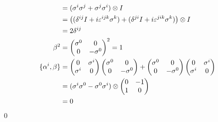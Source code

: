 \documentclass[uplatex,dvipdfmx,a4paper,11pt]{jlreq}
\makeatletter
\theoremstyle{definition}
\renewenvironment{proof}[1][\proofname]{\par
  \normalfont
  \topsep6\p@\@plus6\p@ \trivlist
  \item[\hskip\labelsep{\bfseries #1}\@addpunct{\bfseries}]\ignorespaces\quad\par
}{%
  \qed\endtrivlist\@endpefalse
}
\renewcommand\proofname{証明}
\makeatother
\begin{document}
\begin{proof}
\begin{align}
                                     & = (\sigma^i\sigma^j + \sigma^j\sigma^i)\otimes I                                                           \\
                                     & = \qty((\delta^{ij}I + i\varepsilon^{ijk}\sigma^k) + (\delta^{ji}I + i\varepsilon^{jik}\sigma^k))\otimes I \\
                                     & = 2\delta^{ij}                                                                                             \\
    \beta^2                          & = \begin{pmatrix}
                                           \sigma^0 & 0         \\
                                           0        & -\sigma^0
                                         \end{pmatrix}^2 = 1                                                                                     \\
    \lbrace\alpha^i, \beta\rbrace    & = \begin{pmatrix}
                                           0        & \sigma^i \\
                                           \sigma^i & 0
                                         \end{pmatrix}
    \begin{pmatrix}
      \sigma^0 & 0         \\
      0        & -\sigma^0
    \end{pmatrix} +
    \begin{pmatrix}
      \sigma^0 & 0         \\
      0        & -\sigma^0
    \end{pmatrix}
    \begin{pmatrix}
      0        & \sigma^i \\
      \sigma^i & 0
    \end{pmatrix}                                                                                                                           \\
                                     & = (\sigma^i\sigma^0 - \sigma^0\sigma^i)\otimes\begin{pmatrix}
                                                                                       0 & -1 \\
                                                                                       1 & 0
                                                                                     \end{pmatrix}                                               \\
                                     & = 0
  \end{align}
\end{proof}
\end{document}
